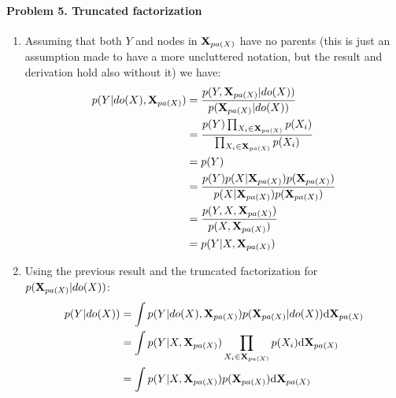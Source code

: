 \documentclass{amsmlaj}
\begin{document}
\paragraph{Problem 5. Truncated factorization}
\begin{sol}
	\begin{enumerate}
		\item Assuming that both $Y$ and nodes in $\bm{\mathbf{X}}_{pa(X)}$ have no parents
			(this is just an assumption made to have a more uncluttered notation, but
			the result and derivation hold also without it) we have:
			\begin{align}
				p(Y|do(X),\bm{\mathbf{X}}_{pa(X)})
				&=\frac{p(Y,\bm{\mathbf{X}}_{pa(X)}|do(X))}{p(\bm{\mathbf{X}}_{pa(X)}|do(X))} \\
				&=\frac{p(Y)\prod_{X_i \in \bm{\mathbf{X}}_{pa(X)}}p(X_i)}{\prod_{X_i \in \bm{\mathbf{X}}_{pa(X)}}p(X_i)} \\
				&=p(Y) \\
				&=\frac{p(Y)p(X|\bm{\mathbf{X}}_{pa(X)})p(\bm{\mathbf{X}}_{pa(X)})}{p(X|\bm{\mathbf{X}}_{pa(X)})p(\bm{\mathbf{X}}_{pa(X)})} \\
				&=\frac{p(Y,X,\bm{\mathbf{X}}_{pa(X)})}{p(X,\bm{\mathbf{X}}_{pa(X)})} \\
				&=p(Y|X,\bm{\mathbf{X}}_{pa(X)})
			\end{align}
		\item Using the previous result and the truncated factorization for
			$p(\bm{\mathbf{X}}_{pa(X)}|do(X))$:
			\begin{align}
				p(Y|do(X))
				&=\int p(Y|do(X),\bm{\mathbf{X}}_{pa(X)})p(\bm{\mathbf{X}}_{pa(X)}|do(X))\mathrm{d}\bm{\mathbf{X}}_{pa(X)} \\
				&=\int p(Y|X,\bm{\mathbf{X}}_{pa(X)})\prod_{X_i \in \bm{\mathbf{X}}_{pa(X)}}p(X_i)\mathrm{d}\bm{\mathbf{X}}_{pa(X)} \\
				&=\int p(Y|X,\bm{\mathbf{X}}_{pa(X)})p(\bm{\mathbf{X}}_{pa(X)})\mathrm{d}\bm{\mathbf{X}}_{pa(X)}
			\end{align}
	\end{enumerate}
\end{sol}
\end{document}
